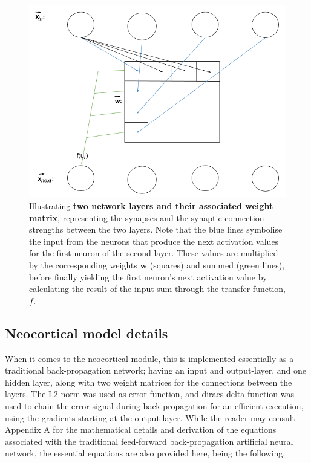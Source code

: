 \begin{figure}
    \centering
    \includegraphics[width=12cm]{fig/network_propagation}
    \caption{Illustrating \textbf{two network layers and their associated weight matrix}, representing the synapses and the synaptic connection strengths between the two layers. Note that the blue lines symbolise the input from the neurons that produce the next activation values for the first neuron of the second layer. These values are multiplied by the corresponding weights $\textbf{w}$ (squares) and summed (green lines), before finally yielding the first neuron's next activation value by calculating the result of the input sum through the transfer function, $f$.}
    \label{fig:network_layout}
\end{figure}


\subsection{Neocortical model details}

When it comes to the neocortical module, this is implemented essentially as a traditional back-propagation network; having an input and output-layer, and one hidden layer, along with two weight matrices for the connections between the layers. The L2-norm was used as error-function, and diracs delta function was used to chain the error-signal during back-propagation for an efficient execution, using the gradients starting at the output-layer. While the reader may consult Appendix A for the mathematical details and derivation of the equations associated with the traditional feed-forward back-propagation artificial neural network, the essential equations are also provided here, being the following,

